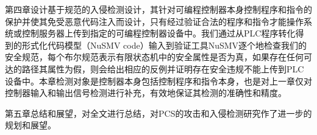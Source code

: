 第四章设计基于规范的入侵检测设计，其针对可编程控制器本身控制程序和指令的保护并使其免受恶意代码注入而设计，只有经过验证合法的程序和指令才能操作系统或控制服务器上传到指定的可编程控制器设备中。我们通过从PLC程序转化得到的形式化代码模型（NuSMV code）输入到验证工具NuSMV逐个地检查我们的安全规范，每个布尔规范表示有限状态机中的安全属性是否为真，如果存在任何可达的路径其属性为假，则会给出相应的反例并证明存在安全违规不能上传到PLC设备中。本章检测对象是控制器本身包括控制程序和指令本身，也是对上一章仅对控制器输入和输出信号检测进行补充，有效地保证其检测的准确性和精度。

第五章总结和展望，对全文进行总结，对PCS的攻击和入侵检测研究作了进一步的规划和展望。



